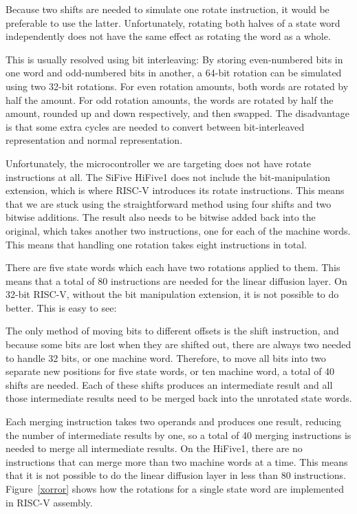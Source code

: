 Because two shifts are needed to simulate one rotate instruction, it would be
preferable to use the latter. Unfortunately, rotating both halves of a state
word independently does not have the same effect as rotating the word as a
whole.

This is usually resolved using bit interleaving: By storing even-numbered bits
in one word and odd-numbered bits in another, a 64-bit rotation can be simulated
using two 32-bit rotations. For even rotation amounts, both words are rotated by
half the amount. For odd rotation amounts, the words are rotated by half the
amount, rounded up and down respectively, and then swapped. The disadvantage is
that some extra cycles are needed to convert between bit-interleaved
representation and normal representation.

Unfortunately, the microcontroller we are targeting does not have rotate
instructions at all. The SiFive HiFive1 does not include the bit-manipulation
extension, which is where RISC-V introduces its rotate instructions. This means
that we are stuck using the straightforward method using four shifts and two
bitwise additions. The result also needs to be bitwise added back into the
original, which takes another two instructions, one for each of the machine
words. This means that handling one rotation takes eight instructions in total.

There are five state words which each have two rotations applied to them. This
means that a total of 80 instructions are needed for the linear diffusion layer. On
32-bit RISC-V, without the bit manipulation extension, it is not possible to do
better. This is easy to see:

The only method of moving bits to different offsets is the shift instruction,
and because some bits are lost when they are shifted out, there are always two
needed to handle 32 bits, or one machine word. Therefore, to move all bits into
two separate new positions for five state words, or ten machine word, a total of
40 shifts are needed. Each of these shifts produces an intermediate result and
all those intermediate results need to be merged back into the unrotated state
words.

Each merging instruction takes two operands and produces one result, reducing
the number of intermediate results by one, so a total of 40 merging instructions
is needed to merge all intermediate results. On the HiFive1, there are no
instructions that can merge more than two machine words at a time. This means
that it is not possible to do the linear diffusion layer in less than 80
instructions. Figure~\ref{xorror} shows how the rotations for a single state
word are implemented in RISC-V assembly.

